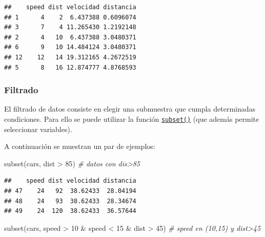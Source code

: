 \documentclass[
]{book}
\newenvironment{Shaded}{\begin{snugshade}}{\end{snugshade}}
\newcommand{\CommentTok}[1]{\textcolor[rgb]{0.56,0.35,0.01}{\textit{#1}}}
\newcommand{\DecValTok}[1]{\textcolor[rgb]{0.00,0.00,0.81}{#1}}
\newcommand{\FunctionTok}[1]{\textcolor[rgb]{0.00,0.00,0.00}{#1}}
\newcommand{\NormalTok}[1]{#1}
\newcommand{\OtherTok}[1]{\textcolor[rgb]{0.56,0.35,0.01}{#1}}
\newcommand{\SpecialCharTok}[1]{\textcolor[rgb]{0.00,0.00,0.00}{#1}}
\theoremstyle{break}
\begin{document}
\begin{Shaded}
\end{Shaded}

\begin{verbatim}
##    speed dist velocidad distancia
## 1      4    2  6.437388 0.6096074
## 3      7    4 11.265430 1.2192148
## 2      4   10  6.437388 3.0480371
## 6      9   10 14.484124 3.0480371
## 12    12   14 19.312165 4.2672519
## 5      8   16 12.874777 4.8768593
\end{verbatim}

\hypertarget{filtrado}{%
\subsubsection{Filtrado}\label{filtrado}}

El filtrado de datos consiste en
elegir una submuestra que cumpla determinadas condiciones. Para ello se
puede utilizar la función \href{https://www.rdocumentation.org/packages/base/versions/3.6.1/topics/subset}{\texttt{subset()}}
(que además permite seleccionar variables).

A continuación se muestran un par de ejemplos:

\begin{Shaded}
\begin{Highlighting}[]
\FunctionTok{subset}\NormalTok{(cars, dist }\SpecialCharTok{\textgreater{}} \DecValTok{85}\NormalTok{) }\CommentTok{\# datos con dis\textgreater{}85}
\end{Highlighting}
\end{Shaded}

\begin{verbatim}
##    speed dist velocidad distancia
## 47    24   92  38.62433  28.04194
## 48    24   93  38.62433  28.34674
## 49    24  120  38.62433  36.57644
\end{verbatim}

\begin{Shaded}
\begin{Highlighting}[]
\FunctionTok{subset}\NormalTok{(cars, speed }\SpecialCharTok{\textgreater{}} \DecValTok{10} \SpecialCharTok{\&}\NormalTok{ speed }\SpecialCharTok{\textless{}} \DecValTok{15} \SpecialCharTok{\&}\NormalTok{ dist }\SpecialCharTok{\textgreater{}} \DecValTok{45}\NormalTok{) }\CommentTok{\# speed en (10,15) y dist\textgreater{}45}
\end{Highlighting}
\end{Shaded}
\end{document}
